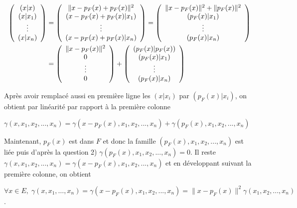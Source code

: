 {\begin{enumerate}
{\begin{align*}\ensuremath
\left(
\begin{array}{c}
(x|x)\\
(x|x_1)\\
\vdots\\
(x|x_n)
\end{array}
\right)&=\left(
\begin{array}{c}
\|x-p_F(x)+p_F(x)\|^2\\
(x-p_F(x)+p_F(x)|x_1)\\
\vdots\\
(x-p_F(x)+p_F(x)|x_n)
\end{array}
\right)=\left(
\begin{array}{c}
\|x-p_F(x)\|^2+\|p_F(x)\|^2\\
(p_F(x)|x_1)\\
\vdots\\
(p_F(x)|x_n)
\end{array}
\right)\\
 &=\left(
\begin{array}{c}
\|x-p_F(x)\|^2\\
0\\
\vdots\\
0
\end{array}
\right)+\left(
\begin{array}{c}
(p_F(x)|p_F(x))\\
(p_F(x)|x_1)\\
\vdots\\
(p_F(x)|x_n)
\end{array}
\right)
\end{align*}

Après avoir remplacé aussi en première ligne les $(x|x_i)$ par $(p_F(x)|x_i)$, on obtient par linéarité par rapport à la première colonne

\begin{center}
$\gamma(x,x_1,x_2,...,x_n) =\gamma(x-p_F(x),x_1,x_2,...,x_n) +\gamma(p_F(x),x_1,x_2,...,x_n)$
\end{center}

Maintenant, $p_F(x)$ est dans $F$ et donc la famille $(p_F(x),x_1,x_2,...,x_n)$ est liée puis d'après la question 2) $\gamma(p_F(x),x_1,x_2,...,x_n) = 0$. Il reste $\gamma(x,x_1,x_2,...,x_n) =\gamma(x-p_F(x),x_1,x_2,...,x_n)$ et en développant suivant la première colonne, on obtient

\begin{center}
$\forall x\in E,\;\gamma(x,x_1,\ldots,x_n)=\gamma(x- p_F(x),x_1,x_2,...,x_n) =\|x- p_F(x)\|^2\gamma(x_1,x_2,...,x_n)$.
\end{center}

}
\end{enumerate}}
